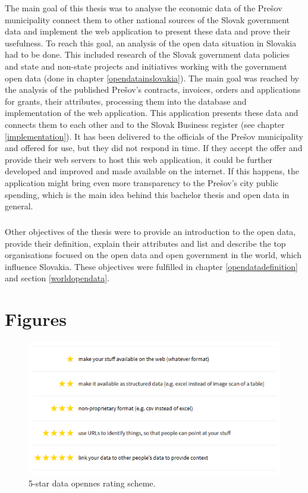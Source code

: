 \documentclass[thesis=B,english]{FITthesis}[2012/06/26]
\begin{document}
{\begin{conclusion}
	The main goal of this thesis was to analyse the economic data of the Prešov municipality connect them to other national sources of the Slovak government data and implement the web application to present these data and prove their usefulness. To reach this goal, an analysis of the open data situation in Slovakia had to be done. This included research of the Slovak government data policies and state and non-state projects and initiatives working with the government open data (done in chapter \ref{opendatainslovakia}). The main goal was reached by the analysis of the published Prešov's contracts, invoices, orders and applications for grants, their attributes, processing them into the database and implementation of the web application. This application presents these data and connects them to each other and to the Slovak Business register (see chapter \ref{implementation}). It has been delivered to the officials of the Prešov municipality and offered for use, but they did not respond in time. If they accept the offer and provide their web servers to host this web application, it could be further developed and improved and made available on the internet. If this happens, the application might bring even more transparency to the Prešov's city public spending, which is the main idea behind this bachelor thesis and open data in general.
	\paragraph*{}Other objectives of the thesis were to provide an introduction to the open data, provide their definition, explain their attributes and list and describe the top organisations focused on the open data and open government in the world, which influence Slovakia. These objectives were fulfilled in chapter \ref{opendatadefinition} and section \ref{worldopendata}. 
\end{conclusion}

\chapter*{Figures}
\begin{figure}[H]
  \includegraphics[width=\linewidth]{pictures/5starRating.png}
  \caption{5-star data opennes rating scheme. \cite{5stardata}}
  \label{fig:5-star}
\end{figure}

}
\end{document}
